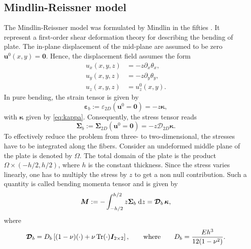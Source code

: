 \subsection{Mindlin-Reissner model}
The Mindlin-Reissner model was formulated by Mindlin in the fifties \cite{mindlin1951}. It represent a first-order shear deformation theory for describing the bending of plate. The in-plane displacement of the mid-plane are assumed to be zero $\bm{u}^0(x,y)=\bm{0}$. Hence, the displacement field assumes the form
\begin{equation}
\begin{aligned}
u_x(x,y,z) &= -z \partial_x \theta_x, \\
u_y(x,y,z) &= -z \partial_y \theta_y, \\
u_z(x,y,z) &= u_z^0(x,y).
\end{aligned}
\end{equation}
In pure bending, the strain tensor is given by
\[
\bm{\varepsilon}_b := \varepsilon_{2D}(\bm{u}^0=\bm{0}) = -z \bm{\kappa},
\]
with $\bm\kappa$ given by \eqref{eq:kappa}. Consequently, the stress tensor reads
\[
\bm{\Sigma}_b := \bm{\Sigma}_{2D}(\bm{u}^0=\bm{0}) = -z \bm{\mathcal{D}}_{2D} \bm{\kappa}.
\]
To effectively reduce the problem from three- to two-dimensional, the stresses have to be integrated along the fibers. Consider an undeformed middle plane of the plate is denoted by $\Omega$. The total domain of the plate is the product $\Omega \times (-h/2, h/2)$, where $h$ is the constant thickness. Since the stress varies linearly, one has to multiply the stress by $z$ to get a non null contribution. Such a quantity is called bending momenta tensor and is given by 
\begin{equation}\label{eq:momenta}
\bm{M} :=-\int_{-h/2}^{h/2} z \bm{\Sigma}_{b} \d{z} = \bm{\mathcal{D}}_{b} \, \bm{\kappa}, 
\end{equation}
where 
\begin{equation}\label{eq:Db}
\bm{\mathcal{D}}_{b} = D_b \left[ (1-\nu) (\cdot) + \nu \operatorname{Tr}(\cdot) \bm{I}_{2\times 2} \right], \qquad \text{where} \qquad D_b = \frac{E h^3}{12(1-\nu^2)}.
\end{equation}


